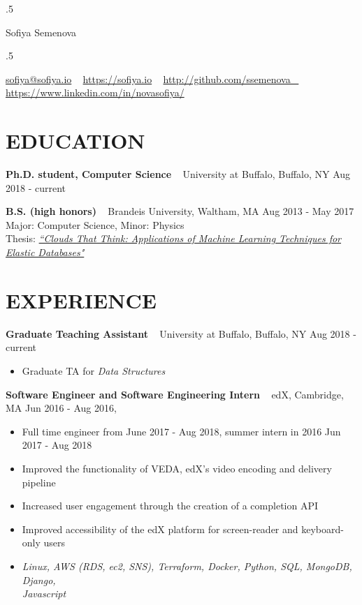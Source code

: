 \documentclass{res}
\begin{document}
 \moveleft.5\hoffset\centerline{\namefont Sofiya Semenova}
 \smallskip
 \moveleft.5\hoffset\centerline{\href{sofiya@sofiya.io}{sofiya@sofiya.io} ~ \href{https://sofiya.io}{https://sofiya.io} ~ \href{http://github.com/ssemenova}{http://github.com/ssemenova ~ \href{https://www.linkedin.com/in/novasofiya/}{https://www.linkedin.com/in/novasofiya/}}}


\vspace{-3mm}

\begin{resume}


\section{EDUCATION}

\textbf{Ph.D. student, Computer Science} ~ University at Buffalo, Buffalo, NY \hfill Aug 2018 - current

\textbf{B.S. (high honors)} ~ Brandeis University, Waltham, MA \hfill Aug 2013 - May 2017 \\
	Major: Computer Science, Minor: Physics \\
	Thesis: \href{https://sofiya.io/media/thesis.pdf}{\sl “Clouds That Think: Applications of Machine Learning Techniques for Elastic Databases"}

\section{EXPERIENCE}

\textbf{Graduate Teaching Assistant} ~ University at Buffalo, Buffalo, NY \hfill Aug 2018 - current \\ 
	\begin{itemize}  \itemsep -2pt %
	\item Graduate TA for {\sl Data Structures} 
	\end{itemize}


\textbf{Software Engineer and Software Engineering Intern} ~ edX, Cambridge, MA \hfill Jun 2016 - Aug 2016, \\ 
	\begin{itemize}  \itemsep -2pt %
	\item Full time engineer from June 2017 - Aug 2018, summer intern in 2016 \hfill Jun 2017 - Aug 2018
	\item Improved the functionality of VEDA, edX's video encoding and delivery pipeline
	\item Increased user engagement through the creation of a completion API
	\item Improved accessibility of the edX platform for screen-reader and keyboard-only users
	\item {\sl Linux, AWS (RDS, ec2, SNS), Terraform, Docker, Python, SQL, MongoDB, Django, \\ 
		Javascript}
	\end{itemize}


\end{resume}
\end{document}
